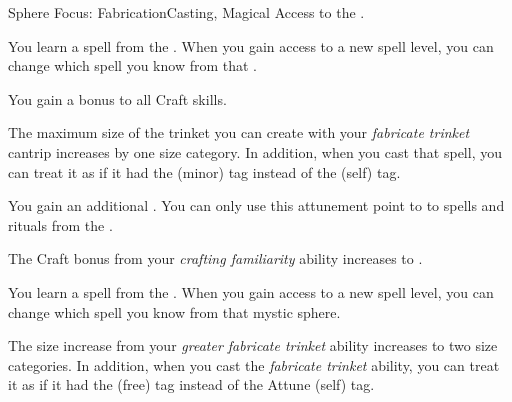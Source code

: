     \begin{feat}{Sphere Focus: Fabrication}{Casting, Magical}
        \featpre Access to the  .

         You learn a spell from the  .
        When you gain access to a new spell level, you can change which spell you know from that .

         You gain a  bonus to all Craft skills.

         The maximum size of the trinket you can create with your \textit{fabricate trinket} cantrip increases by one size category.
        In addition, when you cast that spell, you can treat it as if it had the  (minor) tag instead of the  (self) tag.

         You gain an additional .
        You can only use this attunement point to  to spells and rituals from the  .

         The Craft bonus from your \textit{crafting familiarity} ability increases to .

         You learn a spell from the  .
        When you gain access to a new spell level, you can change which spell you know from that mystic sphere.

         The size increase from your \textit{greater fabricate trinket} ability increases to two size categories.
        In addition, when you cast the \textit{fabricate trinket} ability, you can treat it as if it had the  (free) tag instead of the Attune (self) tag.
    \end{feat}

